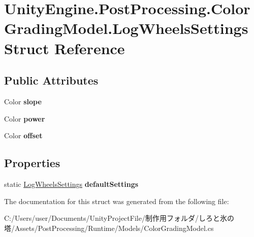 \hypertarget{struct_unity_engine_1_1_post_processing_1_1_color_grading_model_1_1_log_wheels_settings}{}\section{Unity\+Engine.\+Post\+Processing.\+Color\+Grading\+Model.\+Log\+Wheels\+Settings Struct Reference}
\label{struct_unity_engine_1_1_post_processing_1_1_color_grading_model_1_1_log_wheels_settings}
\subsection*{Public Attributes}
\begin{DoxyCompactItemize}
\item 
\mbox{\label{struct_unity_engine_1_1_post_processing_1_1_color_grading_model_1_1_log_wheels_settings_a7f494c64bb76d4f2ff2964062444fadb}} 
Color {\bfseries slope}
\item 
\mbox{\label{struct_unity_engine_1_1_post_processing_1_1_color_grading_model_1_1_log_wheels_settings_adf368213cad3dabd7d738f0107d31089}} 
Color {\bfseries power}
\item 
\mbox{\label{struct_unity_engine_1_1_post_processing_1_1_color_grading_model_1_1_log_wheels_settings_ad89a46fb9a7ad450ecd2687fcde2b02c}} 
Color {\bfseries offset}
\end{DoxyCompactItemize}
\subsection*{Properties}
\begin{DoxyCompactItemize}
\item 
\mbox{\label{struct_unity_engine_1_1_post_processing_1_1_color_grading_model_1_1_log_wheels_settings_ab7c51b8a45966521c63d4817f71b86dd}} 
static \hyperlink{struct_unity_engine_1_1_post_processing_1_1_color_grading_model_1_1_log_wheels_settings}{Log\+Wheels\+Settings} {\bfseries default\+Settings}
\end{DoxyCompactItemize}


The documentation for this struct was generated from the following file\+:\begin{DoxyCompactItemize}
\item 
C\+:/\+Users/user/\+Documents/\+Unity\+Project\+File/制作用フォルダ/しろと氷の塔/\+Assets/\+Post\+Processing/\+Runtime/\+Models/Color\+Grading\+Model.\+cs\end{DoxyCompactItemize}
